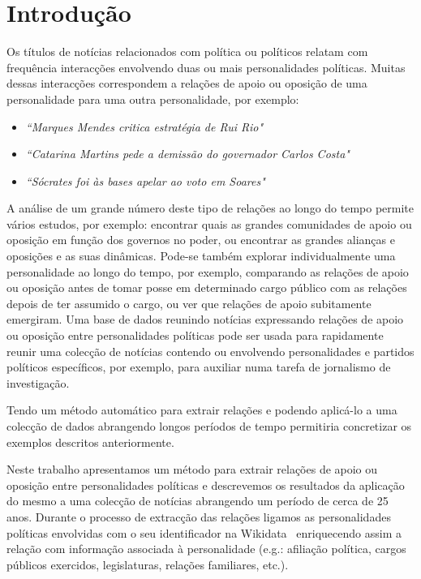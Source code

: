 \documentclass[a4paper, twocolumn, 11pt, twoside]{article}
\begin{document}
\section{Introdução}
\label{sec:intro}

Os títulos de notícias relacionados com política ou políticos relatam com frequência interacções envolvendo duas ou mais personalidades políticas. Muitas dessas interacções correspondem a relações de apoio ou oposição de uma personalidade para uma outra personalidade, por exemplo:

\begin{itemize}
\item{\textit{``Marques Mendes critica estratégia de Rui Rio"}}
\item{\textit{``Catarina Martins pede a demissão do governador Carlos Costa"}}
\item{\textit{``Sócrates foi às bases apelar ao voto em Soares"}}
\end{itemize}

A análise de um grande número deste tipo de relações ao longo do tempo permite vários estudos, por exemplo: encontrar quais as grandes comunidades de apoio ou oposição em função dos governos no poder, ou encontrar as grandes alianças e oposições e as suas dinâmicas. Pode-se também explorar individualmente uma personalidade ao longo do tempo, por exemplo, comparando as relações de apoio ou oposição antes de tomar posse em determinado cargo público com as relações depois de ter assumido o cargo, ou ver que relações de apoio subitamente emergiram. Uma base de dados reunindo notícias expressando relações de apoio ou oposição entre personalidades políticas pode ser usada para rapidamente reunir uma colecção de notícias contendo ou envolvendo personalidades e partidos políticos específicos, por exemplo, para auxiliar numa tarefa de jornalismo de investigação. 

Tendo um método automático para extrair relações e podendo aplicá-lo a uma colecção de dados abrangendo longos períodos de tempo permitiria concretizar os exemplos descritos anteriormente.

Neste trabalho apresentamos um método para extrair relações de apoio ou oposição entre personalidades políticas e descrevemos os resultados da aplicação do mesmo a uma colecção de notícias abrangendo um período de cerca de 25 anos. Durante o processo de extracção das relações ligamos as personalidades políticas envolvidas com o seu identificador na Wikidata~\citep{MKGGB2018} enriquecendo assim a relação com informação associada à personalidade (e.g.: afiliação política, cargos públicos exercidos, legislaturas, relações familiares, etc.). 
\end{document}
